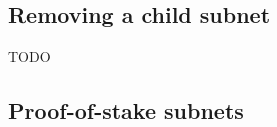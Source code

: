 \subsection{Removing a child subnet}
\label{sec:remove}

TODO

\subsection{Proof-of-stake subnets}
\label{sec:pos-subnets}


